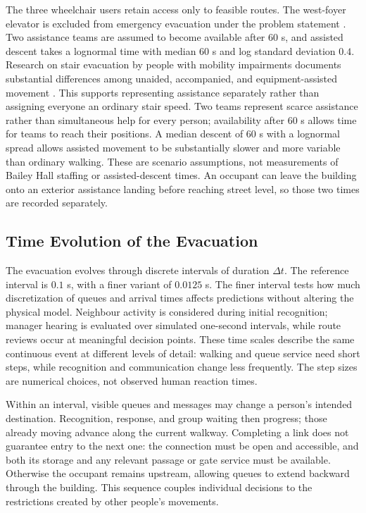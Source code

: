 \documentclass[11pt,a4paper]{article}
\begin{document}
The three wheelchair users retain access only to feasible routes. The west-foyer elevator is excluded from emergency evacuation under the problem statement \cite{brief}. Two assistance teams are assumed to become available after $60$ s, and assisted descent takes a lognormal time with median $60$ s and log standard deviation $0.4$. Research on stair evacuation by people with mobility impairments documents substantial differences among unaided, accompanied, and equipment-assisted movement \cite{mobility}. This supports representing assistance separately rather than assigning everyone an ordinary stair speed. Two teams represent scarce assistance rather than simultaneous help for every person; availability after $60$ s allows time for teams to reach their positions. A median descent of $60$ s with a lognormal spread allows assisted movement to be substantially slower and more variable than ordinary walking. These are scenario assumptions, not measurements of Bailey Hall staffing or assisted-descent times. An occupant can leave the building onto an exterior assistance landing before reaching street level, so those two times are recorded separately.

\subsection{Time Evolution of the Evacuation}

The evacuation evolves through discrete intervals of duration $\Delta t$. The reference interval is $0.1$ s, with a finer variant of $0.0125$ s. The finer interval tests how much discretization of queues and arrival times affects predictions without altering the physical model. Neighbour activity is considered during initial recognition; manager hearing is evaluated over simulated one-second intervals, while route reviews occur at meaningful decision points. These time scales describe the same continuous event at different levels of detail: walking and queue service need short steps, while recognition and communication change less frequently. The step sizes are numerical choices, not observed human reaction times.

Within an interval, visible queues and messages may change a person's intended destination. Recognition, response, and group waiting then progress; those already moving advance along the current walkway. Completing a link does not guarantee entry to the next one: the connection must be open and accessible, and both its storage and any relevant passage or gate service must be available. Otherwise the occupant remains upstream, allowing queues to extend backward through the building. This sequence couples individual decisions to the restrictions created by other people's movements.
\end{document}
